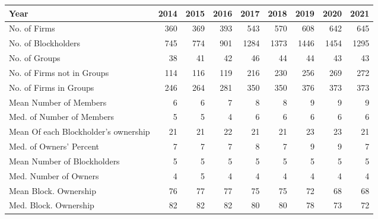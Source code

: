 \begin{tabular}{lrrrrrrrr}
\toprule
Year &  2014 &  2015 &  2016 &  2017 &  2018 &  2019 &  2020 &  2021 \\
\midrule
No. of Firms                         &   360 &   369 &   393 &   543 &   570 &   608 &   642 &   645 \\
No. of Blockholders                  &   745 &   774 &   901 &  1284 &  1373 &  1446 &  1454 &  1295 \\
No. of Groups                        &    38 &    41 &    42 &    46 &    44 &    44 &    43 &    43 \\
No. of Firms not in Groups           &   114 &   116 &   119 &   216 &   230 &   256 &   269 &   272 \\
No. of Firms in Groups               &   246 &   264 &   281 &   350 &   350 &   376 &   373 &   373 \\
Mean Number of Members               &     6 &     6 &     7 &     8 &     8 &     9 &     9 &     9 \\
Med. of  Number of Members           &     5 &     5 &     4 &     6 &     6 &     6 &     6 &     6 \\
Mean Of each Blockholder’s ownership &    21 &    21 &    22 &    21 &    21 &    23 &    23 &    21 \\
Med. of Owners' Percent              &     7 &     7 &     7 &     8 &     7 &     9 &     9 &     7 \\
Mean Number of Blockholders          &     5 &     5 &     5 &     5 &     5 &     5 &     5 &     5 \\
Med. Number of Owners                &     4 &     5 &     4 &     4 &     4 &     4 &     4 &     4 \\
Mean Block. Ownership                &    76 &    77 &    77 &    75 &    75 &    72 &    68 &    68 \\
Med. Block. Ownership                &    82 &    82 &    82 &    80 &    80 &    78 &    73 &    72 \\
\bottomrule
\end{tabular}
